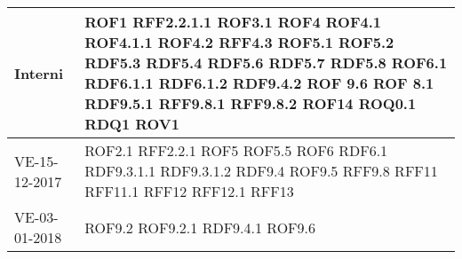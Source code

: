 \documentclass[../AnalisideiRequisiti.tex]{subfiles}
\begin{document}
\begin{longtable}{| p{4cm} | p{4cm} |}
		\newline Interni &  \newline ROF1 \newline RFF2.2.1.1 \newline ROF3.1 \newline ROF4 \newline ROF4.1  \newline ROF4.1.1  \newline ROF4.2  \newline RFF4.3 \newline ROF5.1 \newline ROF5.2 \newline RDF5.3 \newline RDF5.4 \newline RDF5.6  \newline RDF5.7  \newline RDF5.8 \newline ROF6.1 \newline RDF6.1.1 \newline RDF6.1.2 \newline RDF9.4.2 \newline ROF 9.6  \newline ROF 8.1  \newline RDF9.5.1  \newline RFF9.8.1  \newline RFF9.8.2 \newline ROF14 \newline ROQ0.1  \newline RDQ1  \newline ROV1 \\[1em]
	\hline
		\newline  VE-15-12-2017 & \newline ROF2.1 \newline RFF2.2.1 \newline ROF5 \newline ROF5.5 \newline ROF6 \newline RDF6.1 \newline RDF9.3.1.1 \newline RDF9.3.1.2 \newline RDF9.4 \newline ROF9.5 \newline RFF9.8 \newline RFF11 \newline RFF11.1 \newline RFF12 \newline RFF12.1 \newline RFF13 \\[1em]
	\hline
		\newline VE-03-01-2018 &  \newline ROF9.2 \newline ROF9.2.1 \newline RDF9.4.1 \newline ROF9.6 \\[1em]


\end{longtable}
\end{document}
